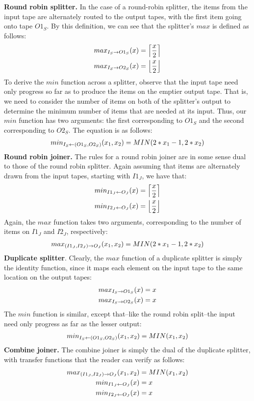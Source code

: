 {\bf Round robin splitter.}  In the case of a round-robin splitter, the
items from the input tape are alternately routed to the output tapes,
with the first item going onto tape $O1_S$.  By this definition, we
can see that the splitter's $max$ is defined as follows:
\begin{align*}
max_{I_S \rightarrow O1_S}(x) &= \left\lceil\frac{x}{2}\right\rceil \\
max_{I_S \rightarrow O2_S}(x) &= \left\lfloor\frac{x}{2}\right\rfloor
\end{align*}
To derive the $min$ function across a splitter, observe that the input
tape need only progress so far as to produce the items on the emptier
output tape.  That is, we need to consider the number of items on both
of the splitter's output to determine the minimum number of items that
are needed at its input.  Thus, our $min$ function has two arguments:
the first corresponding to $O1_S$ and the second corresponding to
$O2_S$.  The equation is as follows:
\begin{align*}
min_{I_S \leftarrow (O1_S, O2_S)}(x_1, x_2) = MIN(2*x_1-1, 2*x_2)
\end{align*}
{\bf Round robin joiner.}  The rules for a round robin joiner are in
some sense dual to those of the round robin splitter.  Again assuming
that items are alternately drawn from the input tapes, starting with
$I1_J$, we have that:
\begin{align*}
min_{I1_J \leftarrow O_J}(x) &= \left\lceil\frac{x}{2}\right\rceil \\
min_{I2_J \leftarrow O_J}(x) &= \left\lfloor\frac{x}{2}\right\rfloor
\end{align*}
Again, the $max$ function takes two arguments, corresponding to the
number of items on $I1_J$ and $I2_J$, respectively:
\begin{align*}
max_{(I1_J, I2_J) \rightarrow O_J}(x_1, x_2) = MIN(2*x_1-1, 2*x_2)
\end{align*}
{\bf Duplicate splitter}.  Clearly, the $max$ function of a duplicate
splitter is simply the identity function, since it maps each element
on the input tape to the same location on the output tapes:
\begin{align*}
max_{I_S \rightarrow O1_S}(x) &= x \\
max_{I_S \rightarrow O2_S}(x) &= x
\end{align*}
The $min$ function is similar, except that--like the round robin
split--the input need only progress as far as the lesser output:
\begin{align*}
min_{I_S \leftarrow (O1_S, O2_S)}(x_1, x_2) = MIN(x_1, x_2)
\end{align*}
{\bf Combine joiner.} The combine joiner is simply the dual of the
duplicate splitter, with transfer functions that the reader can verify
as follows:
\begin{align*}
max_{(I1_J, I2_J) \rightarrow O_J}(x_1, x_2) &= MIN(x_1, x_2) \\
min_{I1_J \leftarrow O_J}(x) &= x \\
min_{I2_J \leftarrow O_J}(x) &= x
\end{align*}

